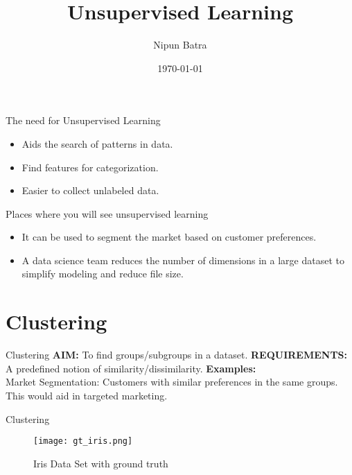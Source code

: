 \documentclass{beamer}
\title{Unsupervised Learning}
\date{\today}
\author{Nipun Batra}
\institute{IIT Gandhinagar}
\begin{document}
  \maketitle

\begin{frame}{The need for Unsupervised Learning}
\begin{itemize}
\item Aids the search of patterns in data.
\item Find features for categorization.
\item Easier to collect unlabeled data.
\end{itemize}
\pause
Places where you will see unsupervised learning 
\begin{itemize}
\item It can be used to segment the market based on customer preferences.
\item A data science team reduces the number of dimensions in a large dataset to simplify modeling and reduce file size.
\end{itemize}
\end{frame}

\section{Clustering}

\begin{frame}{Clustering}
\textbf{AIM:} To find groups/subgroups in a dataset.
\pause
\textbf{REQUIREMENTS:} A predefined notion of similarity/dissimilarity.
\pause
\textbf{Examples:} \\
Market Segmentation: Customers with similar preferences in the same groups. This would aid in targeted marketing.
\end{frame}

\begin{frame}{Clustering}
\begin{figure}[htp]
    \centering
    \texttt{[image: gt\_iris.png]}
    \caption{Iris Data Set with ground truth}
\end{figure}
\end{frame}
\end{document}
